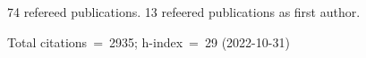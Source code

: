 74 refereed publications. 13 refeered publications as first author.

Total citations~=~2935; h-index~=~29 (2022-10-31)
